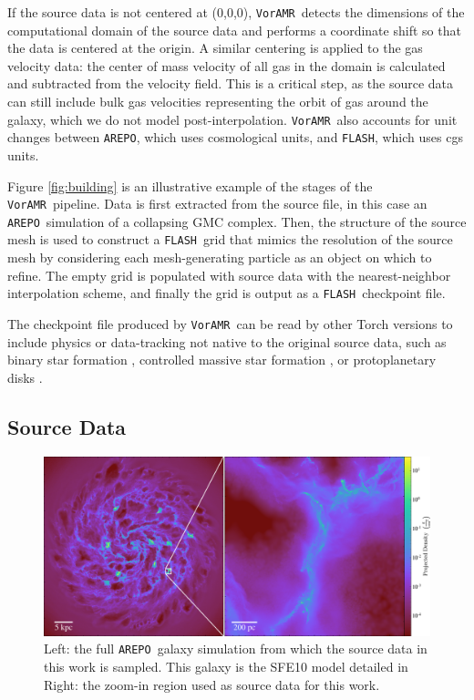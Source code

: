 \documentclass[twoside]{drexel-thesis}
\newcommand\voramr{\texttt{VorAMR}}
\newcommand\flash{\texttt{FLASH}}
\newcommand\arepo{\texttt{AREPO}}
\begin{document}
\begin{thesis}
If the source data is not centered at (0,0,0), \voramr~detects the dimensions of the computational domain of the source data and performs a coordinate shift so that the data is centered at the origin. A similar centering is applied to the gas velocity data: the center of mass velocity of all gas in the domain is calculated and subtracted from the velocity field. This is a critical step, as the source data can still include bulk gas velocities representing the orbit of gas around the galaxy, which we do not model post-interpolation. \voramr~also accounts for unit changes between \arepo, which uses cosmological units, and \flash, which uses cgs units.

Figure \ref{fig:building} is an illustrative example of the stages of the \voramr~pipeline. Data is first extracted from the source file, in this case an \arepo~simulation of a collapsing GMC complex. Then, the structure of the source mesh is used to construct a \flash~grid that mimics the resolution of the source mesh by considering each mesh-generating particle as an object on which to refine. The empty grid is populated with source data with the nearest-neighbor interpolation scheme, and finally the grid is output as a \flash~checkpoint file. 

The checkpoint file produced by \voramr~can be read by other Torch versions to include physics or data-tracking not native to the original source data, such as binary star formation \citep{cournoyer-cloutier_implementing_2021,cournoyer-cloutier_early_2023}, controlled massive star formation \citep{lewis_early-forming_2023}, or protoplanetary disks \citep{wilhelm_modeling_2023,wilhelm_radiation_2023}.

\subsection{Source Data}
\begin{figure}[!htb]    \includegraphics[width=\textwidth]{stacked_h_full.png}
    \caption{Left: the full \arepo~galaxy simulation from which the source data in this work is sampled. This galaxy is the SFE10 model detailed in \citet{li_effects_2020} Right: the zoom-in region used as source data for this work.}
    \label{fig:galaxy}
\end{figure}


\end{thesis}
\end{document}
